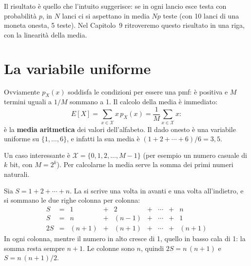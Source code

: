 Il risultato è quello che l'intuito suggerisce: se in ogni lancio esce testa con probabilità $p$, in $N$ lanci ci si
aspettano in media $N p$ teste (con 10 lanci di una moneta onesta, 5 teste). Nel Capitolo~9 ritroveremo questo
risultato in una riga, con la linearità della media.

\section{La variabile uniforme}


Ovviamente $p_X(x)$ soddisfa le condizioni per essere una pmf: è positiva e $M$ termini uguali a $1/M$ sommano a 1. Il
calcolo della media è immediato:
\[ E[X] = \sum_{x \in \mathcal{X}} x\, p_X(x) = \frac{1}{M} \sum_{x \in \mathcal{X}} x : \]
è la \textbf{media aritmetica} dei valori dell'alfabeto. Il dado onesto è una variabile uniforme su
$\{1, \ldots, 6\}$, e infatti la sua media è $(1 + 2 + \cdots + 6)/6 = 3{,}5$.

Un caso interessante è $\mathcal{X} = \{0, 1, 2, \ldots, M - 1\}$ (per esempio un numero casuale di $k$ bit, con
$M = 2^k$). Per calcolarne la media serve la somma dei primi numeri naturali.


\begin{dimostrazione}
 Sia $S = 1 + 2 + \cdots + n$. La si scrive una volta in avanti e una volta
all'indietro, e si sommano le due righe colonna per colonna:
\[
\begin{array}{rcccccccc}
  S & = & 1 & + & 2 & + & \cdots & + & n \\
  S & = & n & + & (n-1) & + & \cdots & + & 1 \\ \hline
  2S & = & (n+1) & + & (n+1) & + & \cdots & + & (n+1)
\end{array}
\]
 In ogni colonna, mentre il numero in alto cresce di 1, quello in basso cala di 1:
la somma resta sempre $n + 1$. Le colonne sono $n$, quindi $2S = n\,(n+1)$ e $S = n\,(n+1)/2$.
\end{dimostrazione}

